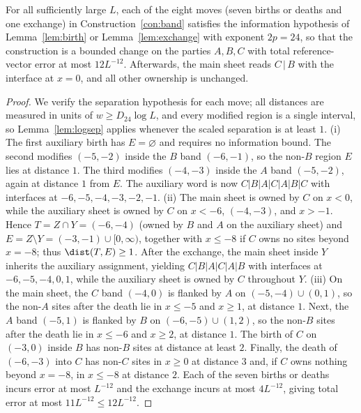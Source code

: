 \begin{lemma}\label{lem:band}
For all sufficiently large $L$, each of the eight moves (seven births or
deaths and one exchange) in Construction~\ref{con:band} satisfies the information hypothesis of
Lemma~\ref{lem:birth} or Lemma~\ref{lem:exchange} with exponent $2p=24$,
so that the construction is a bounded change on the parties $A,B,C$ with
total reference-vector error at most $12L^{-12}$. Afterwards, the main
sheet reads $C\,|\,B$ with the interface at $x=0$, and all other ownership
is unchanged.
\end{lemma}
\begin{proof}
We verify the separation hypothesis for each move; all distances are measured in units of $w\ge D_{24}\log L$, and
every modified region is a single interval, so Lemma~\ref{lem:logsep} applies whenever the scaled separation is at least $1$.
(i) The first auxiliary birth has $E=\varnothing$ and requires no
information bound. The second modifies $(-5,-2)$ inside the
$B$ band $(-6,-1)$, so the non-$B$ region $E$ lies at distance $1$. The
third modifies $(-4,-3)$ inside the $A$ band $(-5,-2)$, again at distance $1$ from $E$. The
auxiliary word is now $C|B|A|C|A|B|C$ with interfaces at $-6,-5,-4,-3,-2,-1$.
(ii) The main sheet is owned by $C$ on $x<0$, while the auxiliary sheet is owned by $C$ on
$x<-6$, $(-4,-3)$, and $x>-1$. Hence $T=Z\cap Y=(-6,-4)$ (owned by $B$ and
$A$ on the auxiliary sheet) and $E=Z\setminus Y=(-3,-1)\cup[0,\infty)$, together with $x\le-8$ if $C$
owns no sites beyond $x=-8$; thus $\dist(T,E)\ge 1$.
After the exchange, the main sheet inside $Y$ inherits the auxiliary
assignment, yielding $C|B|A|C|A|B$ with interfaces at $-6,-5,-4,0,1$, while the auxiliary sheet
is owned by $C$ throughout $Y$.
(iii) On the main sheet, the $C$ band $(-4,0)$ is flanked by $A$ on $(-5,-4)\cup(0,1)$,
so the non-$A$ sites after the death lie in $x\le-5$ and $x\ge1$, at
distance $1$. Next, the $A$ band $(-5,1)$ is flanked by $B$ on
$(-6,-5)\cup(1,2)$, so the non-$B$ sites after the death lie in $x\le-6$ and $x\ge2$,
at distance $1$. The birth of $C$ on $(-3,0)$ inside $B$ has non-$B$ sites
at distance at least $2$. Finally, the death of $(-6,-3)$ into $C$ has non-$C$ sites in
$x\ge0$ at distance $3$ and, if $C$ owns nothing beyond $x=-8$, in
$x\le-8$ at distance $2$. Each of the seven births or deaths incurs error at most $L^{-12}$ and the exchange incurs at most
$4L^{-12}$, giving total error at most $11L^{-12}\le 12L^{-12}$.
\end{proof}

